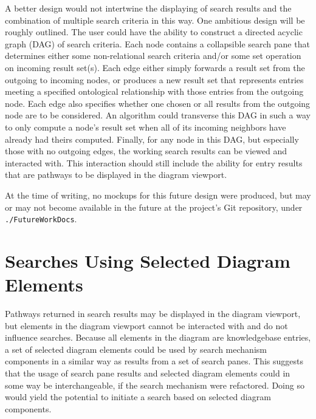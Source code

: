 \documentclass[12pt, letterpaper]{report}
\begin{document}
A better design would not intertwine the displaying of search results and the combination of multiple search criteria in this way. One ambitious design will be roughly outlined. The user could have the ability to construct a directed acyclic graph (DAG) of search criteria. Each node contains a collapsible search pane that determines either some non-relational search criteria and/or some set operation on incoming result set(s). Each edge either simply forwards a result set from the outgoing to incoming nodes, or produces a new result set that represents entries meeting a specified ontological relationship with those entries from the outgoing node. Each edge also specifies whether one chosen or all results from the outgoing node are to be considered. An algorithm could transverse this DAG in such a way to only compute a node's result set when all of its incoming neighbors have already had theirs computed. Finally, for any node in this DAG, but especially those with no outgoing edges, the working search results can be viewed and interacted with. This interaction should still include the ability for entry results that are pathways to be displayed in the diagram viewport.

At the time of writing, no mockups for this future design were produced, but may or may not become available in the future at the project's Git repository, under \verb|./FutureWorkDocs|.

\section {Searches Using Selected Diagram Elements}
Pathways returned in search results may be displayed in the diagram viewport, but elements in the diagram viewport cannot be interacted with and do not influence searches. Because all elements in the diagram are knowledgebase entries, a set of selected diagram elements could be used by search mechanism components in a similar way as results from a set of search panes. This suggests that the usage of search pane results and selected diagram elements could in some way be interchangeable, if the search mechanism were refactored. Doing so would yield the potential to initiate a search based on selected diagram components.
\end{document}
